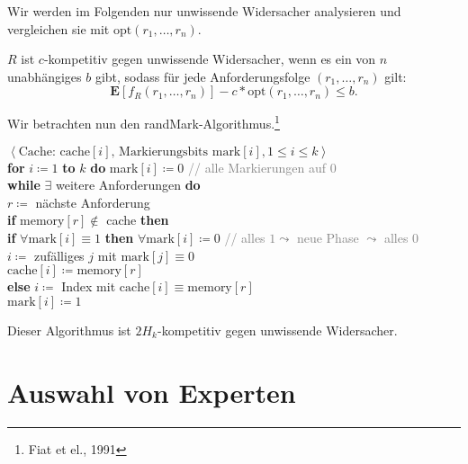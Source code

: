 Wir werden im Folgenden nur unwissende Widersacher analysieren und vergleichen sie mit \( \text{opt}(r_1,\dots,r_n) \).

\begin{definition}
  \( R \) ist \( c \)-kompetitiv gegen unwissende Widersacher, wenn es ein von \( n \) unabhängiges \( b \) gibt, sodass für jede Anforderungsfolge \( (r_1,\dots,r_n ) \) gilt:
  \begin{equation*}
    \textbf{E}[f_R(r_1,\dots,r_n)]-c*\text{opt}(r_1,\dots,r_n) \leq b\text{.}
  \end{equation*}
\end{definition}

Wir betrachten nun den randMark-Algorithmus.\footnote{Fiat et el., 1991}

\begin{pseudocode}
  \( \left\langle \text{Cache: cache}[i]\text{, Markierungsbits mark}[i], 1 \leq i \leq k \right\rangle \) \\
  \textbf{for} \( i \coloneqq 1 \) \textbf{to} \( k \) \textbf{do} mark\( [i] \coloneqq 0 \) \enskip \textcolor{gray}{// alle Markierungen auf \( 0 \)} \\
  \textbf{while} \( \exists \) weitere Anforderungen \textbf{do} \\
  \phantom{\enskip} \( r \coloneqq \) nächste Anforderung \\
  \phantom{\enskip} \textbf{if} \( \text{memory}[r] \not \in \) cache \textbf{then} \\
  \phantom{\enskip} \phantom{\enskip} \textbf{if} \( \forall \text{mark}[i] \equiv 1 \) \textbf{then} \( \forall \text{mark}[i] \coloneqq 0 \) \enskip \textcolor{gray}{// alles \( 1 \leadsto \) neue Phase \( \leadsto \) alles \( 0 \)} \\
  \phantom{\enskip} \phantom{\enskip} \( i \coloneqq \) zufälliges \( j \) mit \( \text{mark}[j] \equiv 0 \) \\
  \phantom{\enskip} \phantom{\enskip} \( \text{cache}[i] \coloneqq \text{memory}[r] \) \\
  \phantom{\enskip} \textbf{else} \( i \coloneqq \) Index mit \( \text{cache}[i] \equiv \text{memory}[r] \) \\
  \( \text{mark}[i] \coloneqq 1 \)

\end{pseudocode}

Dieser Algorithmus ist \( 2H_k \)-kompetitiv gegen unwissende Widersacher.

\section{Auswahl von Experten}

